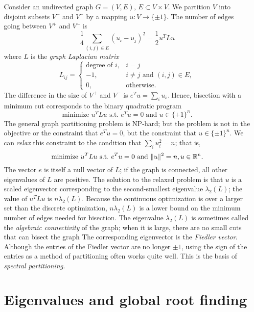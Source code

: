 \documentclass[12pt, leqno]{article} %
\begin{document}
Consider an undirected graph $G = (V,E)$, $E \subset V \times V$.
We partition $V$ into disjoint subsets $V^+$ and $V^-$ by a
mapping $u : V \rightarrow \{ \pm 1 \}$.  The number of edges
going between $V^+$ and $V^-$ is
\[
\frac{1}{4} \sum_{(i,j) \in E} (u_i-u_j)^2 =
\frac{1}{2} u^T L u
\]
where $L$ is the {\em graph Laplacian matrix}
\[
L_{ij} = \begin{cases}
  \mbox{degree of } i, & i = j \\
  -1, & i \neq j \mbox{ and } (i,j) \in E, \\
  0, & \mbox{otherwise}.
\end{cases}
\]
The difference in the size of $V^+$ and $V^-$ is $e^T u = \sum_i u_i$.
Hence, bisection with a minimum cut corresponds to the binary
quadratic program
\[
  \mbox{minimize } u^T L u \mbox{ s.t.~} e^T u = 0 \mbox{ and } u \in
  \{ \pm 1 \}^n.
\]
The general graph partitioning problem is NP-hard; but the problem
is not in the objective or the constraint that $e^T u = 0$, but the
constraint that $u \in \{ \pm 1 \}^n$.  We can {\em relax} this
constraint to the condition that $\sum_i u_i^2 = n$; that is,
\[
\mbox{minimize } u^T L u \mbox{ s.t.~} e^T u = 0 \mbox{ and }
  \|u\|^2 = n, u \in \mathbb{R}^n.
\]
The vector $e$ is itself a null vector of $L$; if the graph is
connected, all other eigenvalues of $L$ are positive.  The solution to
the relaxed problem is that $u$ is a scaled eigenvector corresponding
to the second-smallest eigenvalue $\lambda_2(L)$; the value of $u^T L
u$ is $n \lambda_2(L)$.  Because the continuous optimization is over a
larger set than the discrete optimization, $n \lambda_2(L)$ is a lower
bound on the minimum number of edges needed for bisection.  The
eigenvalue $\lambda_2(L)$ is sometimes called the {\em algebraic
  connectivity} of the graph; when it is large, there are no small
cuts that can bisect the graph  The corresponding eigenvector is
the {\em Fiedler vector}.  Although the entries of the Fiedler vector
are no longer $\pm 1$, using the sign of the entries as a method of
partitioning often works quite well.  This is the basis
of {\em spectral partitioning}.

\section*{Eigenvalues and global root finding}
\end{document}
